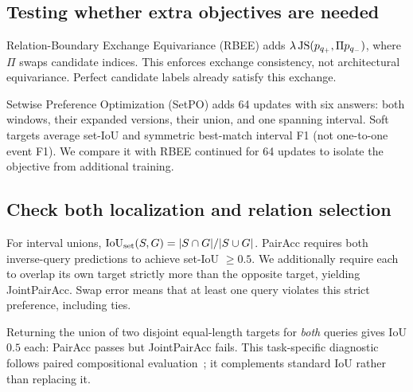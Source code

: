 \subsection{Testing whether extra objectives are needed}
Relation-Boundary Exchange Equivariance (RBEE) adds $\lambda\operatorname{JS}(p_{q_+},\Pi p_{q_-})$, where $\Pi$ swaps candidate indices. This enforces exchange consistency, not architectural equivariance. Perfect candidate labels already satisfy this exchange.

Setwise Preference Optimization (SetPO) adds 64 updates with six answers: both windows, their expanded versions, their union, and one spanning interval. Soft targets average set-IoU and symmetric best-match interval F1 (not one-to-one event F1). We compare it with RBEE continued for 64 updates to isolate the objective from additional training.

\subsection{Check both localization and relation selection}
For interval unions, $\operatorname{IoU}_{\mathrm{set}}(S,G)=|S\cap G|/|S\cup G|$. PairAcc requires both inverse-query predictions to achieve set-IoU $\geq0.5$. We additionally require each to overlap its own target strictly more than the opposite target, yielding JointPairAcc. Swap error means that at least one query violates this strict preference, including ties.

Returning the union of two disjoint equal-length targets for \emph{both} queries gives IoU $0.5$ each: PairAcc passes but JointPairAcc fails. This task-specific diagnostic follows paired compositional evaluation~\cite{thrush2022winoground}; it complements standard IoU rather than replacing it.
